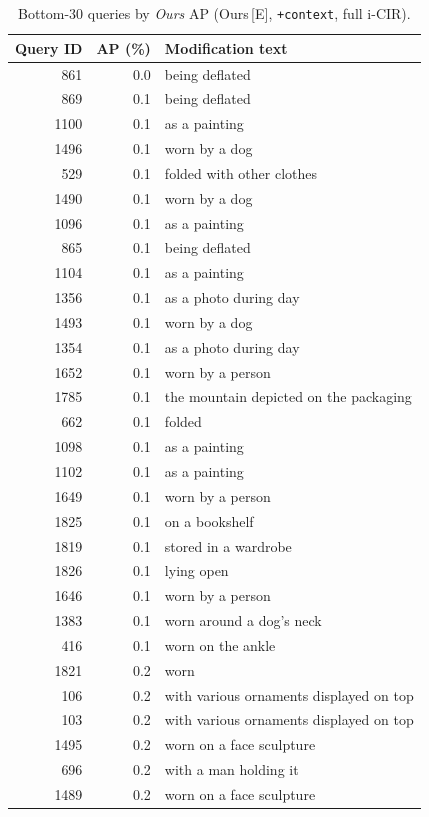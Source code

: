 \begin{table}[htbp]
\centering
\caption{Bottom-30 queries by \emph{Ours} AP (Ours\,[\textsc{E}],
\texttt{+context}, full i-CIR).}
\label{tab:app_bottom_queries}
\small
\begin{tabular}{r r l}
\toprule
Query ID & AP (\%) & Modification text \\
\midrule
 861 & 0.0 & being deflated \\
 869 & 0.1 & being deflated \\
1100 & 0.1 & as a painting \\
1496 & 0.1 & worn by a dog \\
 529 & 0.1 & folded with other clothes \\
1490 & 0.1 & worn by a dog \\
1096 & 0.1 & as a painting \\
 865 & 0.1 & being deflated \\
1104 & 0.1 & as a painting \\
1356 & 0.1 & as a photo during day \\
1493 & 0.1 & worn by a dog \\
1354 & 0.1 & as a photo during day \\
1652 & 0.1 & worn by a person \\
1785 & 0.1 & the mountain depicted on the packaging \\
 662 & 0.1 & folded \\
1098 & 0.1 & as a painting \\
1102 & 0.1 & as a painting \\
1649 & 0.1 & worn by a person \\
1825 & 0.1 & on a bookshelf \\
1819 & 0.1 & stored in a wardrobe \\
1826 & 0.1 & lying open \\
1646 & 0.1 & worn by a person \\
1383 & 0.1 & worn around a dog's neck \\
 416 & 0.1 & worn on the ankle \\
1821 & 0.2 & worn \\
 106 & 0.2 & with various ornaments displayed on top \\
 103 & 0.2 & with various ornaments displayed on top \\
1495 & 0.2 & worn on a face sculpture \\
  696 & 0.2 & with a man holding it \\
1489 & 0.2 & worn on a face sculpture \\
\bottomrule
\end{tabular}
\end{table}

